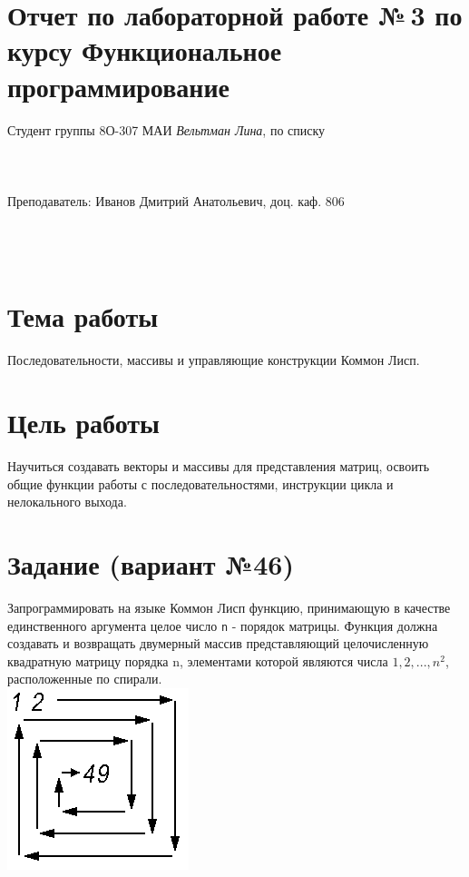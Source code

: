 \documentclass[12pt]{article}
\begin{document}
\section*{Отчет по лабораторной работе №\,3 
по курсу \guillemotleft  Функциональное программирование\guillemotright}
\begin{flushright}
Студент группы 8О-307 МАИ \textit{Вельтман Лина},  по списку \\
 \\
 \\
\ \\
Преподаватель: Иванов Дмитрий Анатольевич, доц. каф. 806 \\
 \\
 \\
 \\

\end{flushright}

\section{Тема работы}
Последовательности, массивы и управляющие конструкции Коммон Лисп.

\section{Цель работы}
Научиться создавать векторы и массивы для представления матриц, освоить общие функции работы с последовательностями, инструкции цикла и нелокального выхода.

\section{Задание (вариант №46)}
Запрограммировать на языке Коммон Лисп функцию, принимающую в качестве единственного аргумента целое число {\tt n} - порядок матрицы. Функция должна создавать и возвращать двумерный массив представляющий целочисленную квадратную матрицу порядка n, элементами которой являются числа {\tt $1, 2, ..., n^{2}$}, расположенные по спирали.\\

\includegraphics {spiralmatrix.png}\\
\end{document}
